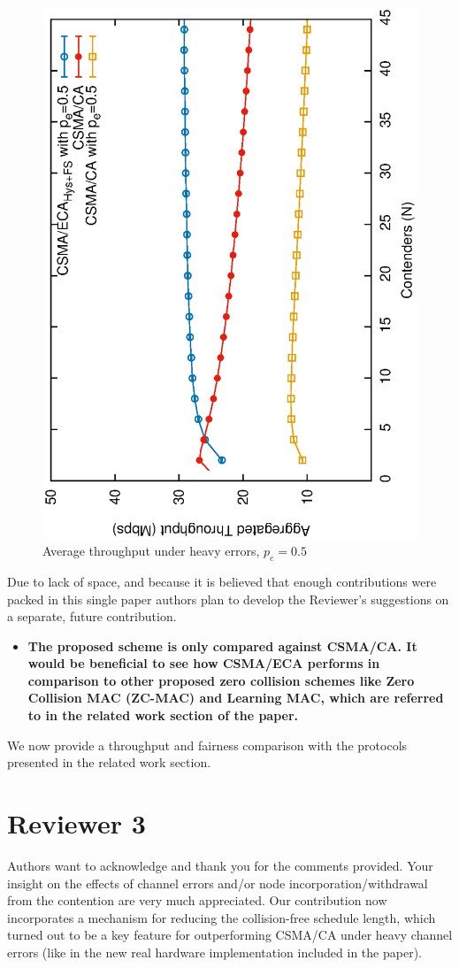 \documentclass[]{article}
\begin{document}
		\begin{figure}[tb]
		\centering
			\includegraphics[width=0.45\linewidth,angle=-90]{figures/tonFigs/heavyErrors.eps}
			\caption{Average throughput under heavy errors, $p_e=0.5$}
			\label{fig:heavyErrors}
		\end{figure}
		
		Due to lack of space, and because it is believed that enough contributions were packed in this single paper authors plan to develop the Reviewer's suggestions on a separate, future contribution.
		
	\begin{itemize}
		\item {\bfseries The proposed scheme is only compared against CSMA/CA. It would be beneficial to see how CSMA/ECA performs in comparison to other proposed zero collision schemes like Zero Collision MAC (ZC-MAC) and Learning MAC, which are referred to in the related work section of the paper.}
	\end{itemize}
		
		We now provide a throughput and fairness comparison with the protocols presented in the related work section.
		
		
		
		
\section{Reviewer 3}
Authors want to acknowledge and thank you for the comments provided. Your insight on the effects of channel errors and/or node incorporation/withdrawal from the contention are very much appreciated. Our contribution now incorporates a mechanism for reducing the collision-free schedule length, which turned out to be a key feature for outperforming CSMA/CA under heavy channel errors (like in the new real hardware implementation included in the paper).
\end{document}
